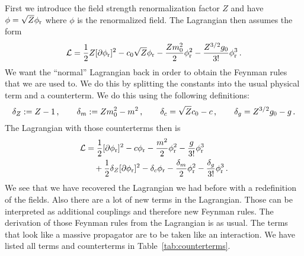 \documentclass[11pt, english, fleqn, DIV=15, headinclude]{scrartcl}
\begin{document}
\newcommand\phir{\phi_\text r}

First we introduce the field strength renormalization factor $Z$ and have $\phi
= \sqrt Z \phir$ where $\phi$ is the renormalized field. The Lagrangian then
assumes the form
\[
    \mathcal L
    = \frac12 Z [\partial \phir]^2 - c_0 \sqrt Z \phir - \frac{Z m_0^2}2\phir^2
    - \frac{Z^{3/2} g_0}{3!} \phir^3 \,.
\]
We want the \enquote{normal} Lagrangian back in order to obtain the Feynman
rules that we are used to. We do this by splitting the constants into the usual
physical term and a counterterm. We do this using the following definitions:
\[
    \delta_Z := Z - 1
    \,,\qquad
    \delta_m := Z m_0^2 - m^2
    \,,\qquad
    \delta_c = \sqrt Z c_0 - c
    \,,\qquad
    \delta_g = Z^{3/2} g_0 - g
    \,.
\]
The Lagrangian with those counterterms then is
\[
    \begin{split}
    \mathcal L
    &= \frac12 [\partial \phir]^2 - c \phir - \frac{m^2}2\phir^2
    - \frac{g}{3!} \phir^3 \\
    &\quad+ \frac12 \delta_Z [\partial \phir]^2 - \delta_c \phir - \frac{\delta_m}2\phir^2
    - \frac{\delta_g}{3!} \phir^3 \,.
    \end{split}
\]
We see that we have recovered the Lagrangian we had before with a redefinition
of the fields. Also there are a lot of new terms in the Lagrangian. Those can
be interpreted as additional couplings and therefore new Feynman rules. The
derivation of those Feynman rules from the Lagrangian is as usual. The terms
that look like a massive propagator are to be taken like an interaction. We
have listed all terms and counterterms in Table~\ref{tab:counterterms}.
\end{document}
